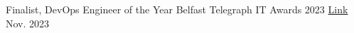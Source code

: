 \begin{cvhonors}

 \cvhonor
   {Finalist, DevOps Engineer of the Year} %
   {Belfast Telegraph IT Awards 2023} %
   {\href{https://www.belfasttelegraph.co.uk/events/belfast-telegraph-it-awards-2023-almost-70-companies-and-individuals-shortlisted/a544085975.html}{Link}} %
   {Nov. 2023} %



\end{cvhonors}